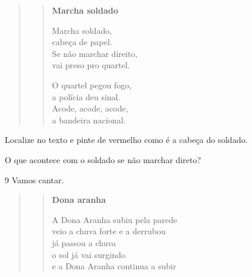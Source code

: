 \begin{quote}
\begin{verse}
\textbf{Marcha soldado}

Marcha soldado,\\
cabeça de papel.\\
Se não marchar direito,\\
vai preso pro quartel.

O quartel pegou fogo,\\
a polícia deu sinal.\\
Acode, acode, acode,\\
a bandeira nacional.
\end{verse}

\end{quote}

\begin{escolha}
\item Localize no texto e pinte de vermelho como é a cabeça do soldado.

\item O que acontece com o soldado se não marchar direto?


\end{escolha}

\num{9} Vamos cantar.

\begin{quote}
\begin{verse}
\textbf{Dona aranha}

A Dona Aranha subiu pela parede\\
veio a chuva forte e a derrubou\\
já passou a chuva\\
o sol já vai surgindo\\
e a Dona Aranha continua a subir
\end{verse}

\end{quote}

